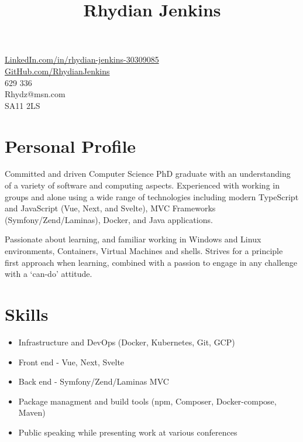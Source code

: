 \documentclass[10pt]{article}
\title{\bfseries\Huge Rhydian Jenkins}
\date{}
\author{}
\begin{document}
\maketitle \vspace{-7em}

\section*{}
\faLinkedin \quad \href{https://www.linkedin.com/in/rhydian-jenkins-30309085/}{LinkedIn.com/in/rhydian-jenkins-30309085}\\
\faGithub \quad \href{https://github.com/RhydianJenkins}{GitHub.com/RhydianJenkins}\\
\faPhone {} 629 336\\
\faEnvelope \quad Rhydz@msn.com\\
\faMapMarker \quad SA11 2LS

\section*{Personal Profile}
\noindent Committed and driven Computer Science PhD graduate with an understanding of a variety of software and computing aspects. Experienced with working in groups and alone using a wide range of technologies including modern TypeScript and JavaScript (Vue, Next, and Svelte), MVC Frameworks (Symfony/Zend/Laminas), Docker, and Java applications.

Passionate about learning, and familiar working in Windows and Linux environments, Containers, Virtual Machines and shells. Strives for a principle first approach when learning, combined with a passion to engage in any challenge with a `can-do' attitude.

\section*{Skills}
\begin{itemize} \setlength\itemsep{-0.25em}
	\item Infrastructure and DevOps (Docker, Kubernetes, Git, GCP)
	\item Front end - Vue, Next, Svelte
	\item Back end - Symfony/Zend/Laminas MVC
	\item Package managment and build tools (npm, Composer, Docker-compose, Maven)
	\item Public speaking while presenting work at various conferences
\end{itemize}
\end{document}
